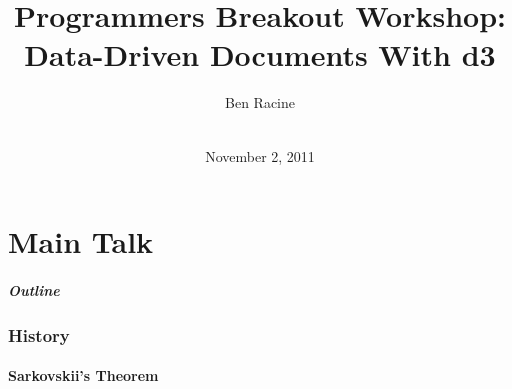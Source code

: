 \documentclass[notes]{beamer}
\title{Programmers Breakout Workshop: Data-Driven Documents With d3}
\author[Ben Racine]{ Ben Racine \inst{1} }
\institute[]{ \inst{1} Cornerstone Systems NW }
\date[AMath 2011]{ \\ November 2, 2011}
\begin{document}
\frame{\titlepage}

\part<presentation>{Main Talk}

\begin{frame}
  \frametitle{Outline}
    \tableofcontents
\end{frame}


\section[History]{History}
\subsection[Sarkovskii's Theorem]{Sarkovskii's Theorem}
\end{document}
